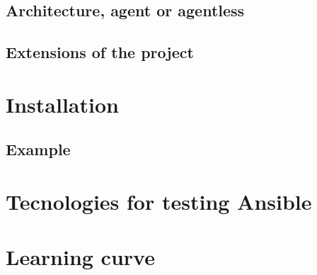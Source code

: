 \documentclass[12pt,a4paper,openright,twoside]{book}
\begin{document}
\subsection{Architecture, agent or agentless}


\subsection{Extensions of the project}

\section{Installation}

\subsection{Example}

\section{Tecnologies for testing Ansible}


\section{Learning curve}

\end{document}
